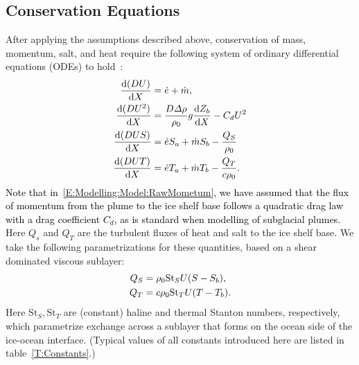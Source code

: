 \documentclass[openacc]{rsproca_new}%
\newcommand{\dd}[2]{\frac{\mathrm{d} #1}{\mathrm{d} #2}}
\newcommand{\red}[1]{{\color{red} #1}}
\newcommand{\blue}[1]{{\color{blue} #1}}
\newcommand{\rout}[1]{\red{\st{#1}}}\newcommand{\ab}[1]{\textcolor{Green}{#1}}\newcommand{\about}[1]{\textcolor{Cyan}{\sout{#1}}}
\renewcommand{\rout}[1]{{}} %
\renewcommand{\blue}[1]{{\textcolor{black}{#1}}} %
\renewcommand{\red}[1]{{}} %
\begin{document}
\subsection{Conservation Equations} 
After applying the assumptions described above,\rout{ and making a standard Boussinesq approximation,} conservation of mass, momentum, salt, and heat require the following system of ordinary differential equations (ODEs) to hold~\cite{Jenkins2011JPhysOcean,Magorrian2016JGeoResOcean}:
\begin{align}
\dd{(DU)}{X} &= \dot{e} + \dot{m},\label{E:Modelling:Model:RawMass}\\
\dd{(DU^2)}{X} &= \frac{D\Delta \rho}{\rho_0} g \dd{Z_b}{X}  -\red{\frac{\tau_T}{\rho_0}} \blue{C_d U^2}\label{E:Modelling:Model:RawMometum}\\
\dd{(DUS)}{X} &= \dot{e}S_a + \dot{m}S_b -\frac{Q_S}{\rho_0}\label{E:Modelling:Model:RawSalt}\\
\dd{(DUT)}{X} &= \dot{e}T_a + \dot{m}T_b -\frac{Q_T}{c \rho_0}.\label{E:Modelling:Model:RawTemp}
\end{align}
\blue{Note that in~\eqref{E:Modelling:Model:RawMometum}, we have assumed that the flux of momentum from the plume to the ice shelf base follows a quadratic drag law with a drag coefficient $C_d$, as is standard when modelling of subglacial plumes.} Here\rout{ $\tau_T$,} $Q_s$ and $Q_T$ are the turbulent fluxes of\rout{ momentum,} heat\rout{,} and salt to the ice shelf base. We take the following parametrizations for these quantities, based on a\rout{ quadratic drag law and} shear dominated viscous sublayer:
\begin{align}
Q_S &= \rho_0 \mathrm{St}_S U (S - S_b),\label{E:Modelling:Model:TurbulentSalt} \\
Q_T &= c \rho_0 \mathrm{St}_T U (T -T_b)\red{,}\blue{.}\label{E:Modelling:Model:TurbulentHeat}
\end{align}
Here $\mathrm{St}_S, \mathrm{St}_T$ are (constant) haline and thermal Stanton numbers, respectively, which parametrize exchange across a sublayer that forms on the ocean side of the ice-ocean interface\rout{, $C_d$ is a drag coefficient, and $c_i$ is the specific heat capacity of ice}. (Typical values of all constants introduced here are listed in table~\ref{T:Constants}.)
\end{document}
